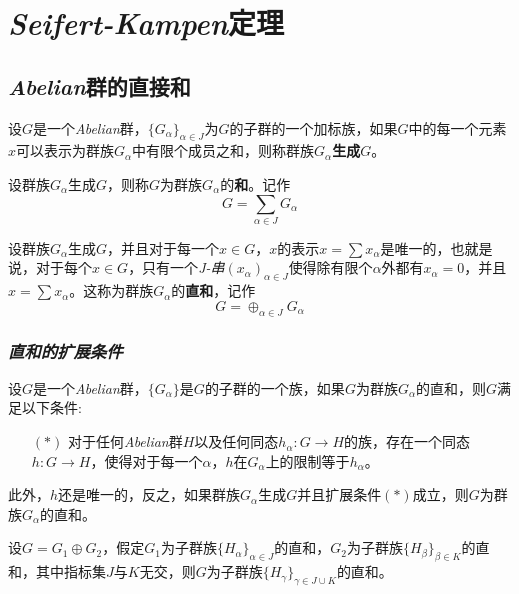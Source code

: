 \chapter{\textsl{Seifert-Kampen}定理}

\section{\textsl{Abelian}群的直接和}

设$G$是一个\textsl{Abelian}群，$\{G_\alpha\}_{{\alpha\in J}}$为$G$的子群的一个加标族，如果$G$中的每一个元素$x$可以表示为群族$G_\alpha$中有限个成员之和，则称群族$G_\alpha$\textbf{生成}$G$。

设群族$G_\alpha$生成$G$，则称$G$为群族$G_\alpha$的\textbf{和}。记作
\begin{equation}
    G=\sum_{\alpha\in J}G_\alpha
\end{equation}

设群族$G_\alpha$生成$G$，并且对于每一个$x\in G$，$x$的表示$x=\sum x_\alpha$是唯一的，也就是说，对于每个$x\in G$，只有一个\textsl{J-串}$(x_\alpha)_{\alpha\in J}$使得除有限个$\alpha$外都有$x_\alpha=0$，并且$x=\sum x_\alpha$。这称为群族$G_\alpha$的\textbf{直和}，记作
\begin{equation}
    G=\oplus_{\alpha\in J} G_\alpha    
\end{equation}

\subsection*{\textsl{直和的扩展条件}}

\begin{mdframed}
    \begin{lemma}
        设$G$是一个\textsl{Abelian}群，$\{G_\alpha\}$是$G$的子群的一个族，如果$G$为群族$G_\alpha$的直和，则$G$满足以下条件:
        \begin{enumerate}[itemindent=2em]
            \item[$(*)$] 对于任何\textsl{Abelian}群$H$以及任何同态$h_\alpha:G\rightarrow H$的族，存在一个同态$h:G\rightarrow H$，使得对于每一个$\alpha$，$h$在$G_\alpha$上的限制等于$h_\alpha$。
        \end{enumerate}

        此外，$h$还是唯一的，反之，如果群族$G_\alpha$生成$G$并且扩展条件$(*)$成立，则$G$为群族$G_\alpha$的直和。
    \end{lemma}
\end{mdframed}

\begin{mdframed}
    \begin{corollary}
        设$G=G_1\oplus G_2$，假定$G_1$为子群族$\{H_\alpha\}_{\alpha\in J}$的直和，$G_2$为子群族$\{H_\beta\}_{\beta\in K}$的直和，其中指标集$J$与$K$无交，则$G$为子群族$\{H_\gamma\}_{\gamma\in J\cup K}$的直和。
    \end{corollary}
\end{mdframed}

